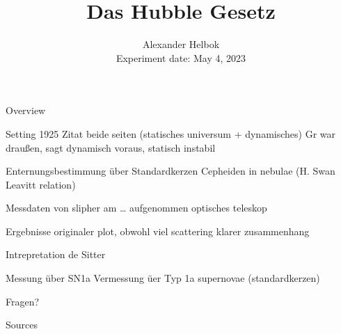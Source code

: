 \documentclass[10pt, dvipsnames]{beamer}
\title{Das Hubble Gesetz}
\author{Alexander Helbok\\Experiment date: May 4, 2023}
\date{}
\begin{document}
	\maketitle
	\begin{frame}{Overview}
		\tableofcontents
	\end{frame}

	\begin{frame}{Setting 1925}
		Zitat beide seiten (statisches universum + dynamisches)
		Gr war draußen, sagt dynamisch voraus, statisch instabil
	\end{frame}
	
	\begin{frame}{Enternungsbestimmung über Standardkerzen}
		Cepheiden in nebulae (H. Swan Leavitt relation)
	\end{frame}

	\begin{frame}{Messdaten}
		von slipher am … aufgenommen
		optisches teleskop
	\end{frame}
	
	\begin{frame}{Ergebnisse}
		originaler plot, obwohl viel scattering klarer zusammenhang
	\end{frame}
	
	\begin{frame}{Intrepretation}
		de Sitter 
	\end{frame}
	
	\begin{frame}{Messung über SN1a}
		Vermessung üer Typ 1a supernovae (standardkerzen)
	\end{frame}
	
%	


\begin{frame}[standout]
	\Huge Fragen?
\end{frame}

\begin{frame}{Sources}
	\printbibliography
\end{frame}
\end{document}
